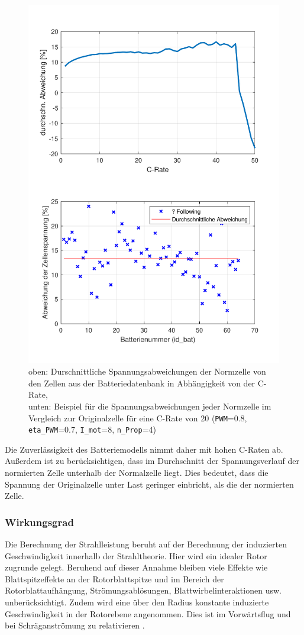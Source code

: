 \begin{figure}[H]
\centering
	\includegraphics{Diagramme/Abweichungen.pdf}
	\caption{oben: Durschnittliche Spannungsabweichungen der Normzelle von den Zellen aus der Batteriedatenbank in Abhängigkeit von der C-Rate, \\
	unten: Beispiel für die Spannungsabweichungen jeder Normzelle im Vergleich zur Originalzelle für eine C-Rate von 20 (\texttt{PWM}=0.8, \texttt{eta\_PWM}=0.7, \texttt{I\_mot}=8, \texttt{n\_Prop}=4)}
	\label{abb:abweichungen}
\end{figure}
Die Zuverlässigkeit des Batteriemodells nimmt daher mit hohen C-Raten ab. Außerdem ist zu berücksichtigen, dass im Durchschnitt der Spannungsverlauf der normierten Zelle unterhalb der Normalzelle liegt. Dies bedeutet, dass die Spannung der Originalzelle unter Last geringer einbricht, als die der normierten Zelle.  

\subsubsection{Wirkungsgrad}
Die Berechnung der Strahlleistung beruht auf der Berechnung der induzierten Geschwindigkeit innerhalb der Strahltheorie. Hier wird ein idealer Rotor zugrunde gelegt.
Beruhend auf dieser Annahme bleiben viele Effekte wie Blattspitzeffekte an der Rotorblattspitze und im Bereich der Rotorblattaufhängung, Strömungsablösungen, Blattwirbelinteraktionen usw. unberücksichtigt.  Zudem wird eine über den Radius konstante induzierte Geschwindigkeit in der Rotorebene angenommen. Dies ist im Vorwärtsflug und bei Schräganströmung zu relativieren \cite[S.226]{Wall.2015}.
